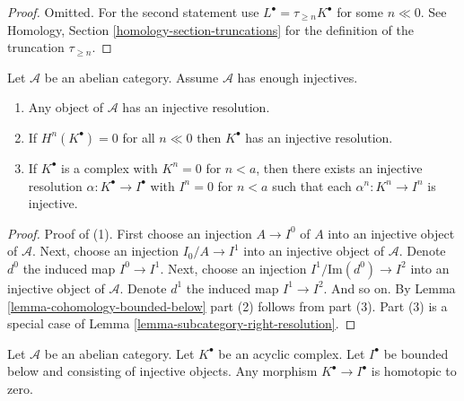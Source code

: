 \begin{proof}
Omitted. For the second statement use
$L^\bullet = \tau_{\geq n}K^\bullet$ for
some $n \ll 0$. See
Homology, Section \ref{homology-section-truncations}
for the definition of the truncation $\tau_{\geq n}$.
\end{proof}

\begin{lemma}
\label{lemma-injective-resolutions-exist}
Let $\mathcal{A}$ be an abelian category.
Assume $\mathcal{A}$ has enough injectives.
\begin{enumerate}
\item Any object of $\mathcal{A}$ has an injective resolution.
\item If $H^n(K^\bullet) = 0$ for all $n \ll 0$ then
$K^\bullet$ has an injective resolution.
\item If $K^\bullet$ is a complex with $K^n = 0$ for $n < a$, then
there exists an injective resolution $\alpha : K^\bullet \to I^\bullet$
with $I^n = 0$ for $n < a$ such that each $\alpha^n : K^n \to I^n$ is
injective.
\end{enumerate}
\end{lemma}

\begin{proof}
Proof of (1). First choose an injection $A \to I^0$ of $A$ into an
injective object of $\mathcal{A}$. Next, choose an injection
$I_0/A \to I^1$ into an injective object of $\mathcal{A}$.
Denote $d^0$ the induced map $I^0 \to I^1$.
Next, choose an injection $I^1/\text{Im}(d^0) \to I^2$ into
an injective object of $\mathcal{A}$. Denote $d^1$ the induced
map $I^1 \to I^2$. And so on.
By Lemma \ref{lemma-cohomology-bounded-below} part (2) follows from part (3).
Part (3) is a special case of
Lemma \ref{lemma-subcategory-right-resolution}.
\end{proof}

\begin{lemma}
\label{lemma-acyclic-is-zero}
Let $\mathcal{A}$ be an abelian category.
Let $K^\bullet$ be an acyclic complex.
Let $I^\bullet$ be bounded below and consisting of injective objects.
Any morphism $K^\bullet \to I^\bullet$ is homotopic to zero.
\end{lemma}

